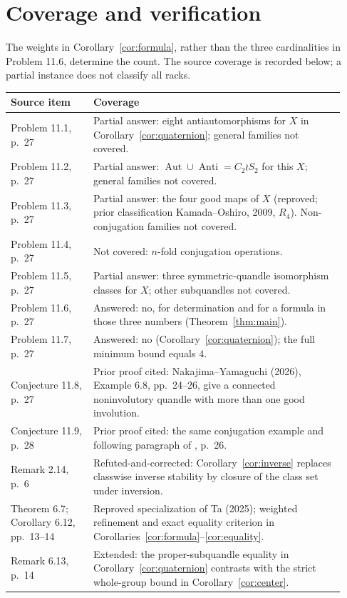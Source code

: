 \documentclass[11pt]{article}
\newcommand{\Aut}{\operatorname{Aut}}
\begin{document}
\section{Coverage and verification}
The weights in Corollary~\ref{cor:formula}, rather than the three
cardinalities in Problem 11.6, determine the count. The source coverage
is recorded below; a partial instance does not classify all racks.

\begin{center}\small
\begin{tabular}{@{}>{\raggedright\arraybackslash}p{0.23\linewidth}>{\raggedright\arraybackslash}p{0.70\linewidth}@{}}\toprule
Source item & Coverage\\\midrule
Problem 11.1, p.~27 & Partial answer: eight antiautomorphisms for $X$
in Corollary~\ref{cor:quaternion}; general families not covered.\\
Problem 11.2, p.~27 & Partial answer: $\Aut\cup\operatorname{Anti}
=C_2\wr S_2$ for this $X$; general families not covered.\\
Problem 11.3, p.~27 & Partial answer: the four good maps of $X$
(reproved; prior classification Kamada--Oshiro, 2009, $R_4$).
Non-conjugation families not covered.\\
Problem 11.4, p.~27 & Not covered: $n$-fold conjugation operations.\\
Problem 11.5, p.~27 & Partial answer: three symmetric-quandle
isomorphism classes for $X$; other subquandles not covered.\\
Problem 11.6, p.~27 & Answered: no, for determination and for a formula
in those three numbers (Theorem~\ref{thm:main}).\\
Problem 11.7, p.~27 & Answered: no (Corollary~\ref{cor:quaternion});
the full minimum bound equals $4$.\\
Conjecture 11.8, p.~27 & Prior proof cited: Nakajima--Yamaguchi
(2026), Example 6.8, pp.~24--26, give a connected noninvolutory
quandle with more than one good involution.\\
Conjecture 11.9, p.~28 & Prior proof cited: the same conjugation
example and following paragraph of \cite{NY}, p.~26.\\
Remark 2.14, p.~6 & Refuted-and-corrected:
Corollary~\ref{cor:inverse} replaces classwise inverse stability
by closure of the class set under inversion.\\
Theorem 6.7; Corollary 6.12, pp.~13--14 & Reproved specialization
of Ta (2025); weighted refinement and exact equality criterion in
Corollaries~\ref{cor:formula}--\ref{cor:equality}.\\
Remark 6.13, p.~14 & Extended: the proper-subquandle equality
in Corollary~\ref{cor:quaternion} contrasts with the strict whole-group
bound in Corollary~\ref{cor:center}.\\\bottomrule
\end{tabular}
\end{center}
\end{document}
